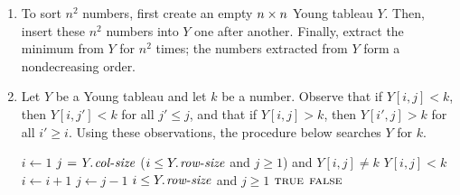 \begin{enumerate}[\thechapter-1]
\begin{enumerate}[\it a.]
\begin{codebox}
\li      $j \gets \id{largest-c}$ \label{li:while-loop-end-for-insert}
    \End
\end{codebox}
To establish its correctness, we state the loop invariant (cf.~Exercise~6.5-7) for the  loop in lines \ref{li:while-loop-start-for-insert}--\ref{li:while-loop-end-for-insert} which is straightforward to prove:
\begin{loopinv}
\end{loopinv}
It is clear that the procedure runs in $\bigoh{m + n}$ time if $Y$ is an $m \by n$ matrix.
\item To sort $n^2$ numbers, first create an empty $n \times n$ Young tableau $Y$. Then, insert these $n^2$ numbers into $Y$ one after another. Finally, extract the minimum from $Y$ for $n^2$ times; the numbers extracted from $Y$ form a nondecreasing order.
\item Let $Y$ be a Young tableau and let $k$ be a number. Observe that if $Y[i, j] < k$, then $Y[i, j'] < k$ for all $j' \leq j$, and that if $Y[i, j] > k$, then $Y[i', j] > k$ for all $i' \geq i$. Using these observations, the procedure below searches $Y$ for $k$.
\begin{codebox}
\li $i \gets 1$
\li $j \gets \attrib{Y}{col-size}$
\li \While ($i \leq \attrib{Y}{row-size}$ and $j \geq 1$) and $Y[i, j] \neq k$ \label{li:while-loop-start-for-search}
\li \Do
         \If $Y[i, j] < k$
\li      \Then
               $i \gets i + 1$
\li      \Else {}
\li            $j \gets j - 1$
         \End
    \End \label{li:while-loop-end-for-search}
\li \If $i \leq \attrib{Y}{row-size}$ and $j \geq 1$ 
\li \Then \Return $\textnormal{\scshape true}$
\li \Else \Return $\textnormal{\scshape false}$

\end{codebox}
\end{enumerate}
\end{enumerate}
